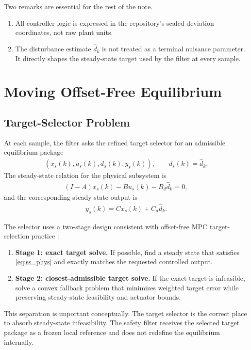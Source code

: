 \documentclass[11pt]{article}
\begin{document}
Two remarks are essential for the rest of the note.
\begin{enumerate}[leftmargin=*]
\item All controller logic is expressed in the repository's scaled deviation coordinates, not raw plant units.
\item The disturbance estimate $\hat d_k$ is not treated as a terminal nuisance parameter. It directly shapes the steady-state target used by the filter at every sample.
\end{enumerate}

\section{Moving Offset-Free Equilibrium}
\subsection{Target-Selector Problem}
At each sample, the filter asks the refined target selector for an admissible equilibrium package
\begin{align}
(x_s(k),u_s(k),d_s(k),y_s(k)),
\qquad
d_s(k)=\hat d_k.
\end{align}
The steady-state relation for the physical subsystem is
\begin{align}
(I-A)x_s(k) - Bu_s(k) - B_d \hat d_k = 0, \label{eq:ss_phys}
\end{align}
and the corresponding steady-state output is
\begin{align}
y_s(k) = Cx_s(k) + C_d \hat d_k. \label{eq:ss_output}
\end{align}

The selector uses a two-stage design consistent with offset-free MPC target-selection practice \cite{pannocchia2003,pannocchia2007,limon2008}:
\begin{enumerate}[leftmargin=*]
\item \textbf{Stage 1: exact target solve.} If possible, find a steady state that satisfies \eqref{eq:ss_phys} and exactly matches the requested controlled output.
\item \textbf{Stage 2: closest-admissible target solve.} If the exact target is infeasible, solve a convex fallback problem that minimizes weighted target error while preserving steady-state feasibility and actuator bounds.
\end{enumerate}
This separation is important conceptually. The target selector is the correct place to absorb steady-state infeasibility. The safety filter receives the selected target package as a frozen local reference and does not redefine the equilibrium internally.
\end{document}
